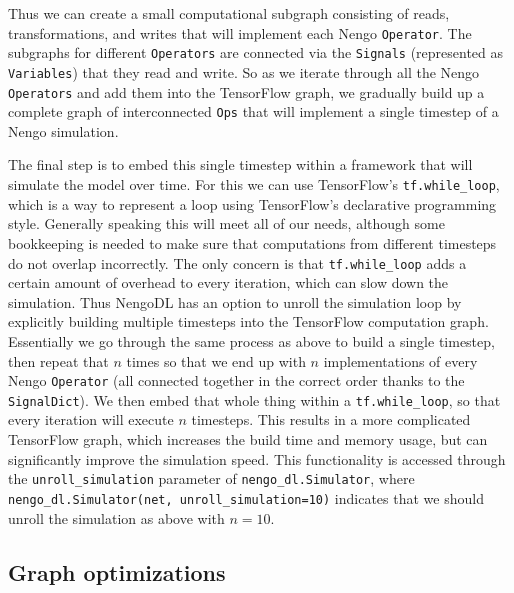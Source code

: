 \documentclass{article}
\begin{document}
Thus we can create a small computational subgraph consisting of reads, transformations, and writes that will implement each Nengo \texttt{Operator}.  The subgraphs for different \texttt{Operators} are connected via the \texttt{Signals} (represented as \texttt{Variables}) that they read and write.  So as we iterate through all the Nengo \texttt{Operators} and add them into the TensorFlow graph, we gradually build up a complete graph of interconnected \texttt{Ops} that will implement a single timestep of a Nengo simulation.

The final step is to embed this single timestep within a framework that will simulate the model over time.  For this we can use TensorFlow's \texttt{tf.while\_loop}, which is a way to represent a loop using TensorFlow's declarative programming style.  Generally speaking this will meet all of our needs, although some bookkeeping is needed to make sure that computations from different timesteps do not overlap incorrectly.  The only concern is that \texttt{tf.while\_loop} adds a certain amount of overhead to every iteration, which can slow down the simulation.  Thus NengoDL has an option to unroll the simulation loop by explicitly building multiple timesteps into the TensorFlow computation graph.  Essentially we go through the same process as above to build a single timestep, then repeat that $n$ times so that we end up with $n$ implementations of every Nengo \texttt{Operator} (all connected together in the correct order thanks to the \texttt{SignalDict}).  We then embed that whole thing within a \texttt{tf.while\_loop}, so that every iteration will execute $n$ timesteps.  This results in a more complicated TensorFlow graph, which increases the build time and memory usage, but can significantly improve the simulation speed.  This functionality is accessed through the \texttt{unroll\_simulation} parameter of \texttt{nengo\_dl.Simulator}, where \texttt{nengo\_dl.Simulator(net, unroll\_simulation=10)} indicates that we should unroll the simulation as above with $n=10$.

\subsection{Graph optimizations}
\label{sec:graphoptimizations}
\end{document}
